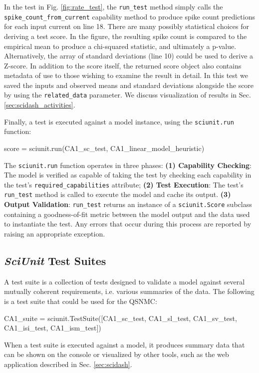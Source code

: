 \documentclass[11pt,letterpaper]{article}
\let\verbx\lstinline
\begin{document}
In the test in Fig. \ref{fig:rate_test}, the \verbx{run_test} method simply calls the \verbx{spike_count_from_current} capability method  to produce spike count predictions for each input current on line 18. There are many possibly statistical choices for deriving a test score.  In the figure, the resulting spike count is compared to the empirical mean to produce a chi-squared statistic, and ultimately a p-value. Alternatively, the array of standard deviations (line 10) could be used to derive a Z-score.  In addition to the score itself, the returned score object also contains metadata of use to those wishing to examine the result in detail. In this test we saved the inputs and observed means and standard deviations alongside the score by using the \verbx{related_data} parameter. We discuss visualization of results in Sec. \ref{sec:scidash_activities}.

Finally, a test is executed against a model instance, using the \verbx{sciunit.run} function:
\begin{python}
score = sciunit.run(CA1_sc_test, CA1_linear_model_heuristic)
\end{python}

The \verbx{sciunit.run} function operates in three phases: \textbf{(1) Capability Checking}: The model is verified as capable of taking the test by checking each capability in the test's \verbx{required_capabilities} attribute; \textbf{(2) Test Execution}: The test's \verbx{run_test} method is called to execute the model and cache its output. \textbf{(3) Output Validation}: \verbx{run_test} returns an instance of a \verbx{sciunit.Score} subclass containing a goodness-of-fit metric between the model output and the data used to instantiate the test.  Any errors that occur during this process are reported by raising an appropriate exception.

\subsection{\textit{SciUnit} Test Suites}
A test suite is a collection of tests designed to validate a model against several mutually coherent requirements, i.e. various summaries of the data.  The following is a test suite that could be used for the QSNMC:  
\begin{python}
CA1_suite = sciunit.TestSuite([CA1_sc_test, CA1_sl_test, CA1_sv_test, CA1_isi_test, CA1_ism_test])
\end{python}
When a test suite is executed against a model, it produces summary data that can be shown on the console or visualized by other tools, such as the web application described in Sec. \ref{sec:scidash}.
\end{document}

